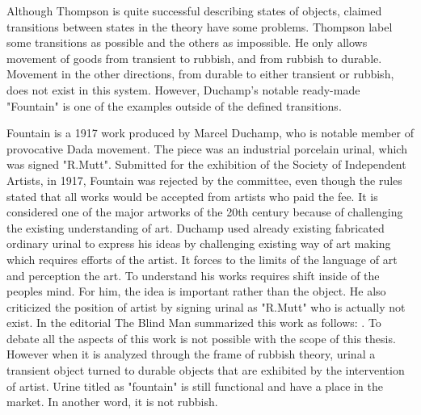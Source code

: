 Although Thompson is quite successful describing states of objects, claimed transitions between states in the theory have some problems. Thompson label some transitions as possible and the others as impossible. He only allows movement of goods from transient to rubbish, and from rubbish to durable. Movement in the other directions, from durable to either transient or rubbish, does not exist in this system. However, Duchamp's notable ready-made "Fountain" is one of the examples outside of the defined transitions.

Fountain is a 1917 work produced by Marcel Duchamp, who is notable member of provocative Dada movement. The piece was an industrial porcelain urinal, which was signed "R.Mutt". Submitted for the exhibition of the Society of Independent Artists, in 1917, Fountain was rejected by the committee, even though the rules stated that all works would be accepted from artists who paid the fee. It is considered one of the major artworks of the 20th century because of challenging the existing understanding of art. Duchamp used already existing fabricated ordinary urinal to express his ideas by challenging existing way of art making which requires efforts of the artist. It forces to the limits of the language of art and perception the art. To understand his works requires shift inside of the peoples mind. For him, the idea is important rather than the object. He also criticized the position of artist by signing urinal as "R.Mutt" who is actually not exist. In the editorial The Blind Man summarized this work as follows:  \citep{duchamp1917mutt}. To debate all the aspects of this work is not possible with the scope of this thesis. However when it is analyzed through the frame of rubbish theory, urinal a transient object turned to durable objects that are exhibited by the intervention of artist. Urine titled as "fountain" is still functional and have a place in the market. In another word, it is not rubbish.


